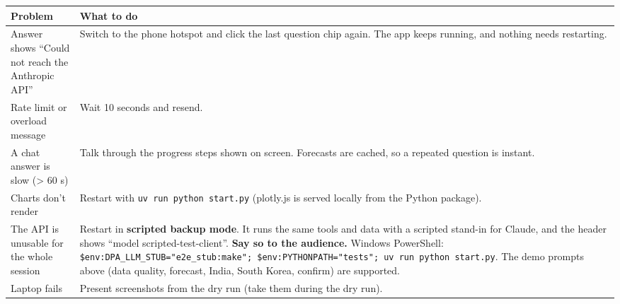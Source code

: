 \documentclass[
]{article}
\newcounter{none} %
\begin{document}
{\def\LTcaptype{none} %
\begin{longtable}[]{@{}
  >{\raggedright\arraybackslash}p{}
  >{\raggedright\arraybackslash}p{}@{}}
\toprule\noalign{}
\begin{minipage}[b]{\linewidth}\raggedright
Problem
\end{minipage} & \begin{minipage}[b]{\linewidth}\raggedright
What to do
\end{minipage} \\
\midrule\noalign{}
\endhead
\bottomrule\noalign{}
\endlastfoot
Answer shows ``Could not reach the Anthropic API'' & Switch to the phone
hotspot and click the last question chip again. The app keeps running,
and nothing needs restarting. \\
Rate limit or overload message & Wait 10 seconds and resend. \\
A chat answer is slow (\textgreater{} 60 s) & Talk through the progress
steps shown on screen. Forecasts are cached, so a repeated question is
instant. \\
Charts don't render & Restart with \texttt{uv\ run\ python\ start.py}
(plotly.js is served locally from the Python package). \\
The API is unusable for the whole session & Restart in \textbf{scripted
backup mode}. It runs the same tools and data with a scripted stand-in
for Claude, and the header shows ``model scripted-test-client''.
\textbf{Say so to the audience.} Windows PowerShell:
\texttt{\$env:DPA\_LLM\_STUB="e2e\_stub:make";\ \$env:PYTHONPATH="tests";\ uv\ run\ python\ start.py}.
The demo prompts above (data quality, forecast, India, South Korea,
confirm) are supported. \\
Laptop fails & Present screenshots from the dry run (take them during
the dry run). \\
\end{longtable}
}
\end{document}
